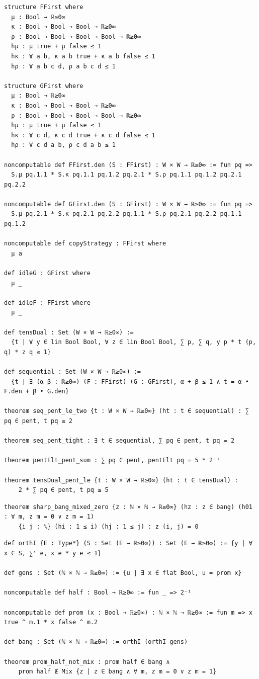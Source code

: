\label{lean:pent-bounds}
\begin{lstlisting}
structure FFirst where
  μ : Bool → ℝ≥0∞
  κ : Bool → Bool → Bool → ℝ≥0∞
  ρ : Bool → Bool → Bool → Bool → ℝ≥0∞
  hμ : μ true + μ false ≤ 1
  hκ : ∀ a b, κ a b true + κ a b false ≤ 1
  hρ : ∀ a b c d, ρ a b c d ≤ 1

structure GFirst where
  μ : Bool → ℝ≥0∞
  κ : Bool → Bool → Bool → ℝ≥0∞
  ρ : Bool → Bool → Bool → Bool → ℝ≥0∞
  hμ : μ true + μ false ≤ 1
  hκ : ∀ c d, κ c d true + κ c d false ≤ 1
  hρ : ∀ c d a b, ρ c d a b ≤ 1

noncomputable def FFirst.den (S : FFirst) : W × W → ℝ≥0∞ := fun pq =>
  S.μ pq.1.1 * S.κ pq.1.1 pq.1.2 pq.2.1 * S.ρ pq.1.1 pq.1.2 pq.2.1 pq.2.2

noncomputable def GFirst.den (S : GFirst) : W × W → ℝ≥0∞ := fun pq =>
  S.μ pq.2.1 * S.κ pq.2.1 pq.2.2 pq.1.1 * S.ρ pq.2.1 pq.2.2 pq.1.1 pq.1.2

noncomputable def copyStrategy : FFirst where
  μ a

def idleG : GFirst where
  μ _

def idleF : FFirst where
  μ _

def tensDual : Set (W × W → ℝ≥0∞) :=
  {t | ∀ y ∈ lin Bool Bool, ∀ z ∈ lin Bool Bool, ∑ p, ∑ q, y p * t (p, q) * z q ≤ 1}

def sequential : Set (W × W → ℝ≥0∞) :=
  {t | ∃ (α β : ℝ≥0∞) (F : FFirst) (G : GFirst), α + β ≤ 1 ∧ t = α • F.den + β • G.den}

theorem seq_pent_le_two {t : W × W → ℝ≥0∞} (ht : t ∈ sequential) : ∑ pq ∈ pent, t pq ≤ 2

theorem seq_pent_tight : ∃ t ∈ sequential, ∑ pq ∈ pent, t pq = 2

theorem pentElt_pent_sum : ∑ pq ∈ pent, pentElt pq = 5 * 2⁻¹

theorem tensDual_pent_le {t : W × W → ℝ≥0∞} (ht : t ∈ tensDual) :
    2 * ∑ pq ∈ pent, t pq ≤ 5
\end{lstlisting}

\label{lean:sharp-bang-mixed-zero}
\begin{lstlisting}
theorem sharp_bang_mixed_zero {z : ℕ × ℕ → ℝ≥0∞} (hz : z ∈ bang) (h01 : ∀ m, z m = 0 ∨ z m = 1)
    {i j : ℕ} (hi : 1 ≤ i) (hj : 1 ≤ j) : z (i, j) = 0
\end{lstlisting}

\label{lean:prom-half-not-mix}
\begin{lstlisting}
def orthI {E : Type*} (S : Set (E → ℝ≥0∞)) : Set (E → ℝ≥0∞) := {y | ∀ x ∈ S, ∑' e, x e * y e ≤ 1}

def gens : Set (ℕ × ℕ → ℝ≥0∞) := {u | ∃ x ∈ flat Bool, u = prom x}

noncomputable def half : Bool → ℝ≥0∞ := fun _ => 2⁻¹

noncomputable def prom (x : Bool → ℝ≥0∞) : ℕ × ℕ → ℝ≥0∞ := fun m => x true ^ m.1 * x false ^ m.2

def bang : Set (ℕ × ℕ → ℝ≥0∞) := orthI (orthI gens)

theorem prom_half_not_mix : prom half ∈ bang ∧
    prom half ∉ Mix {z | z ∈ bang ∧ ∀ m, z m = 0 ∨ z m = 1}
\end{lstlisting}

